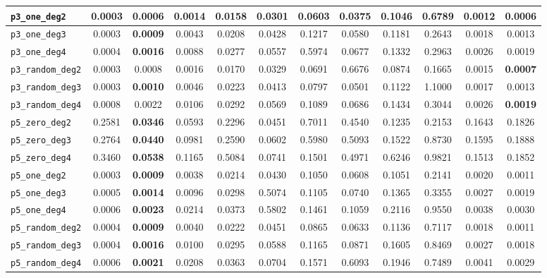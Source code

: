 \begin{landscape}
\begin{table}[H]
{\begin{tabular}{lccccccccccc}
\hline
\texttt{p3\_one\_deg2} & 0.0003 & \textbf{0.0006} & 0.0014 & 0.0158 & 0.0301 & 0.0603 & 0.0375 & 0.1046 & 0.6789 & 0.0012 & 0.0006 \\
\hline
\texttt{p3\_one\_deg3} & 0.0003 & \textbf{0.0009} & 0.0043 & 0.0208 & 0.0428 & 0.1217 & 0.0580 & 0.1181 & 0.2643 & 0.0018 & 0.0013 \\
\hline
\texttt{p3\_one\_deg4} & 0.0004 & \textbf{0.0016} & 0.0088 & 0.0277 & 0.0557 & 0.5974 & 0.0677 & 0.1332 & 0.2963 & 0.0026 & 0.0019 \\
\hline
\texttt{p3\_random\_deg2} & 0.0003 & 0.0008 & 0.0016 & 0.0170 & 0.0329 & 0.0691 & 0.6676 & 0.0874 & 0.1665 & 0.0015 & \textbf{0.0007} \\
\hline
\texttt{p3\_random\_deg3} & 0.0003 & \textbf{0.0010} & 0.0046 & 0.0223 & 0.0413 & 0.0797 & 0.0501 & 0.1122 & 1.1000 & 0.0017 & 0.0013 \\
\hline
\texttt{p3\_random\_deg4} & 0.0008 & 0.0022 & 0.0106 & 0.0292 & 0.0569 & 0.1089 & 0.0686 & 0.1434 & 0.3044 & 0.0026 & \textbf{0.0019} \\
\hline
\texttt{p5\_zero\_deg2} & 0.2581 & \textbf{0.0346} & 0.0593 & 0.2296 & 0.0451 & 0.7011 & 0.4540 & 0.1235 & 0.2153 & 0.1643 & 0.1826 \\
\hline
\texttt{p5\_zero\_deg3} & 0.2764 & \textbf{0.0440} & 0.0981 & 0.2590 & 0.0602 & 0.5980 & 0.5093 & 0.1522 & 0.8730 & 0.1595 & 0.1888 \\
\hline
\texttt{p5\_zero\_deg4} & 0.3460 & \textbf{0.0538} & 0.1165 & 0.5084 & 0.0741 & 0.1501 & 0.4971 & 0.6246 & 0.9821 & 0.1513 & 0.1852 \\
\hline
\texttt{p5\_one\_deg2} & 0.0003 & \textbf{0.0009} & 0.0038 & 0.0214 & 0.0430 & 0.1050 & 0.0608 & 0.1051 & 0.2141 & 0.0020 & 0.0011 \\
\hline
\texttt{p5\_one\_deg3} & 0.0005 & \textbf{0.0014} & 0.0096 & 0.0298 & 0.5074 & 0.1105 & 0.0740 & 0.1365 & 0.3355 & 0.0027 & 0.0019 \\
\hline
\texttt{p5\_one\_deg4} & 0.0006 & \textbf{0.0023} & 0.0214 & 0.0373 & 0.5802 & 0.1461 & 0.1059 & 0.2116 & 0.9550 & 0.0038 & 0.0030 \\
\hline
\texttt{p5\_random\_deg2} & 0.0004 & \textbf{0.0009} & 0.0040 & 0.0222 & 0.0451 & 0.0865 & 0.0633 & 0.1136 & 0.7117 & 0.0018 & 0.0011 \\
\hline
\texttt{p5\_random\_deg3} & 0.0004 & \textbf{0.0016} & 0.0100 & 0.0295 & 0.0588 & 0.1165 & 0.0871 & 0.1605 & 0.8469 & 0.0027 & 0.0018 \\
\hline
\texttt{p5\_random\_deg4} & 0.0006 & \textbf{0.0021} & 0.0208 & 0.0363 & 0.0704 & 0.1571 & 0.6093 & 0.1946 & 0.7489 & 0.0041 & 0.0029 \\
\bottomrule
\end{tabular}
}%
\end{table}
\end{landscape}

